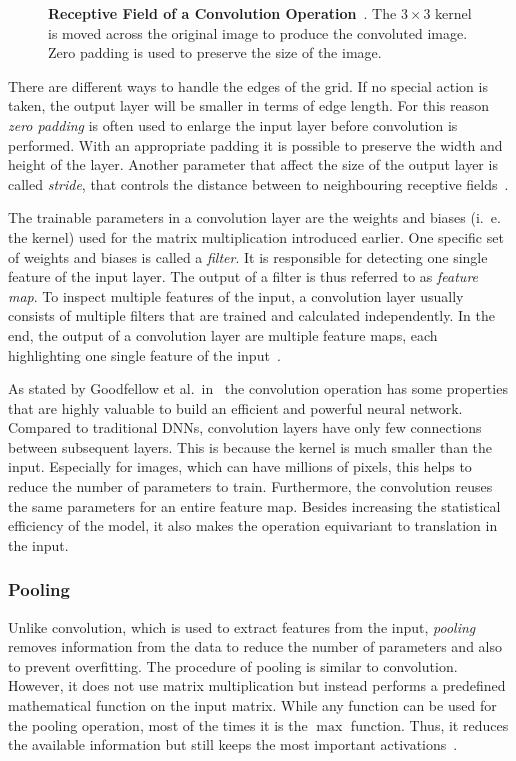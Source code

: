 \begin{figure}[h]
    \centering
    
    \caption[Receptive Field of a Convolution Operation]
    {\textbf{Receptive Field of a Convolution Operation}~\cite[modified]{conv_arithmetic18}. The $3\times 3$ kernel is moved across the original image to produce the convoluted image. Zero padding is used to preserve the size of the image.}
    \label{fig:convolution}
\end{figure}

There are different ways to handle the edges of the grid. If no special action is taken, the output layer will be smaller in terms of edge length. For this reason \emph{zero padding} is often used to enlarge the input layer before convolution is performed. With an appropriate padding it is possible to preserve the width and height of the layer. Another parameter that affect the size of the output layer is called \emph{stride}, that controls the distance between to neighbouring receptive fields~\cite[p.~361]{praxiseinstieg_ml17}.

The trainable parameters in a convolution layer are the weights and biases (i.~e. the kernel) used for the matrix multiplication introduced earlier. One specific set of weights and biases is called a \emph{filter}. It is responsible for detecting one single feature of the input layer. The output of a filter is thus referred to as \emph{feature map}. To inspect multiple features of the input, a convolution layer usually consists of multiple filters that are trained and calculated independently. In the end, the output of a convolution layer are multiple feature maps, each highlighting one single feature of the input~\cite[p.~363f]{praxiseinstieg_ml17}.

As stated by Goodfellow et al.\ in~\cite[pp.~329ff]{DLbook16} the convolution operation has some properties that are highly valuable to build an efficient and powerful neural network. Compared to traditional DNNs, convolution layers have only few connections between subsequent layers. This is because the kernel is much smaller than the input. Especially for images, which can have millions of pixels, this helps to reduce the number of parameters to train. Furthermore, the convolution reuses the same parameters for an entire feature map. Besides increasing the statistical efficiency of the model, it also makes the operation equivariant to translation in the input.

\subsubsection{Pooling}
\label{sec:pooling}
Unlike convolution, which is used to extract features from the input, \emph{pooling} removes information from the data to reduce the number of parameters and also to prevent overfitting. The procedure of pooling is similar to convolution. However, it does not use matrix multiplication but instead performs a predefined mathematical function on the input matrix. While any function can be used for the pooling operation, most of the times it is the $\max$ function. Thus, it reduces the available information but still keeps the most important activations~\cite[p.~369f]{praxiseinstieg_ml17}.

